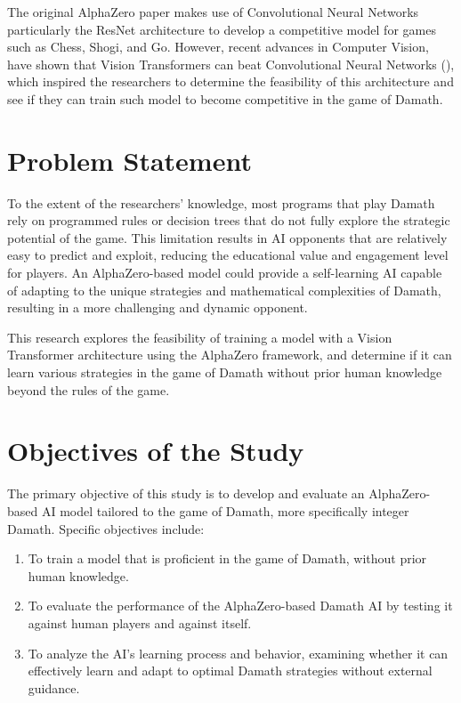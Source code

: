 The original AlphaZero paper makes use of Convolutional Neural Networks  particularly the ResNet architecture to develop a competitive model for games such as Chess, Shogi, and Go. However, recent advances in Computer Vision, have shown that Vision Transformers can beat Convolutional Neural Networks (\cite{dosovitskiy2021imageworth16x16words}), which inspired the researchers to determine the feasibility of this architecture and see if they can train such model to become competitive in the game of Damath.

\section{Problem Statement}

To the extent of the researchers' knowledge, most programs that play Damath rely on programmed rules or decision trees that do not fully explore the strategic potential of the game. This limitation results in AI opponents that are relatively easy to predict and exploit, reducing the educational value and engagement level for players. An AlphaZero-based model could provide a self-learning AI capable of adapting to the unique strategies and mathematical complexities of Damath, resulting in a more challenging and dynamic opponent.

This research explores the feasibility of training a model with a Vision Transformer architecture using the AlphaZero framework, and determine if it can learn various strategies in the game of Damath without prior human knowledge beyond the rules of the game. 

\section{Objectives of the Study}

The primary objective of this study is to develop and evaluate an AlphaZero-based AI model tailored to the game of Damath, more specifically integer Damath. Specific objectives include:
\begin{enumerate}
    \item  To train a model that is proficient in the game of Damath, without prior human knowledge.
    \item To evaluate the performance of the AlphaZero-based Damath AI by testing it against human players and against itself.
    \item To analyze the AI’s learning process and behavior, examining whether it can effectively learn and adapt to optimal Damath strategies without external guidance.
\end{enumerate}

